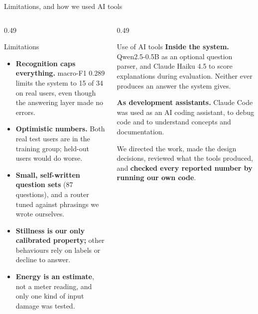 \documentclass[aspectratio=169,11pt]{beamer}
\newcommand{\hilite}[1]{\textcolor{atsorange}{\textbf{#1}}}
\begin{document}
\begin{frame}{Limitations, and how we used AI tools}
  \footnotesize
  \begin{columns}[T,onlytextwidth]
    \begin{column}{0.49\textwidth}
      \begin{block}{Limitations}
        \begin{itemize}
          \item \textbf{Recognition caps everything.} macro-F1 0.289 limits the
          system to 15 of 34 on real users, even though the answering layer
          made no errors.
          \item \textbf{Optimistic numbers.} Both real test users are in the
          training group; held-out users would do worse.
          \item \textbf{Small, self-written question sets} (87 questions), and
          a router tuned against phrasings we wrote ourselves.
          \item \textbf{Stillness is our only calibrated property;} other
          behaviours rely on labels or decline to answer.
          \item \textbf{Energy is an estimate}, not a meter reading, and only
          one kind of input damage was tested.
        \end{itemize}
      \end{block}
    \end{column}
    \begin{column}{0.49\textwidth}
      \begin{block}{Use of AI tools}
        \textbf{Inside the system.} Qwen2.5-0.5B as an optional question
        parser, and Claude Haiku 4.5 to score explanations during evaluation.
        Neither ever produces an answer the system gives.

        \smallskip
        \textbf{As development assistants.} Claude Code was used as an AI coding assistant, 
        to debug code and to understand concepts and documentation. 

        \smallskip
        We directed the work, made the design decisions, reviewed what the
        tools produced, and \hilite{checked every reported number by running
        our own code}.
      \end{block}
    \end{column}
  \end{columns}
\end{frame}
\end{document}
